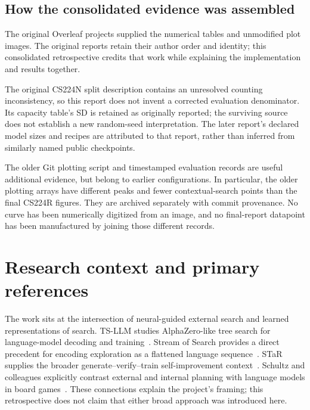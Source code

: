 \documentclass[11pt,letterpaper]{article}
\begin{document}
\FloatBarrier
\subsection{How the consolidated evidence was assembled}
The original Overleaf projects supplied the numerical tables and unmodified plot images. The original reports retain their author order and identity; this consolidated retrospective credits that work while explaining the implementation and results together.

The original CS224N split description contains an unresolved counting inconsistency, so this report does not invent a corrected evaluation denominator. Its capacity table's SD is retained as originally reported; the surviving source does not establish a new random-seed interpretation. The later report's declared model sizes and recipes are attributed to that report, rather than inferred from similarly named public checkpoints.

The older Git plotting script and timestamped evaluation records are useful additional evidence, but belong to earlier configurations. In particular, the older plotting arrays have different peaks and fewer contextual-search points than the final CS224R figures. They are archived separately with commit provenance. No curve has been numerically digitized from an image, and no final-report datapoint has been manufactured by joining those different records.

\section*{Research context and primary references}
The work sits at the intersection of neural-guided external search and learned representations of search. TS-LLM studies AlphaZero-like tree search for language-model decoding and training~\cite{tsllm}. Stream of Search provides a direct precedent for encoding exploration as a flattened language sequence~\cite{sos}. STaR supplies the broader generate--verify--train self-improvement context~\cite{star}. Schultz and colleagues explicitly contrast external and internal planning with language models in board games~\cite{schultz}. These connections explain the project's framing; this retrospective does not claim that either broad approach was introduced here.
\end{document}
